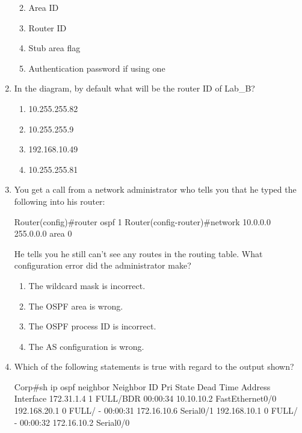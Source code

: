 \begin{enumerate}
  \begin{enumerate}
  \def\labelenumii{\Alph{enumii}.}
    \item
    Area ID
  \item
    Router ID
  \item
    Stub area flag
  \item
    Authentication password if using one
  \end{enumerate}
\item
  In the diagram, by default what will be the router ID of Lab\_B?

  \begin{figure}
  \centering
  \caption{}
  \end{figure}

  \begin{enumerate}
  \def\labelenumii{\Alph{enumii}.}
    \item
    10.255.255.82
  \item
    10.255.255.9
  \item
    192.168.10.49
  \item
    10.255.255.81
  \end{enumerate}
\item
  You get a call from a network administrator who tells you that he
  typed the following into his router:

\begin{cli}
Router(config)#router ospf 1
Router(config-router)#network 10.0.0.0 255.0.0.0 area 0
\end{cli}

  He tells you he still can't see any routes in the routing table. What
  configuration error did the administrator make?

  \begin{enumerate}
  \def\labelenumii{\Alph{enumii}.}
    \item
    The wildcard mask is incorrect.
  \item
    The OSPF area is wrong.
  \item
    \protect\hypertarget{c18.xhtmlux5cux23Page_778}{}{}The OSPF process
    ID is incorrect.
  \item
    The AS configuration is wrong.
  \end{enumerate}
\item
  Which of the following statements is true with regard to the output
  shown?

\begin{cli}
Corp#sh ip ospf neighbor
Neighbor ID     Pri   State      Dead Time   Address         Interface
172.31.1.4        1   FULL/BDR   00:00:34    10.10.10.2     FastEthernet0/0
192.168.20.1      0   FULL/  -   00:00:31    172.16.10.6     Serial0/1
192.168.10.1      0   FULL/  -   00:00:32    172.16.10.2     Serial0/0
\end{cli}


\end{enumerate}
